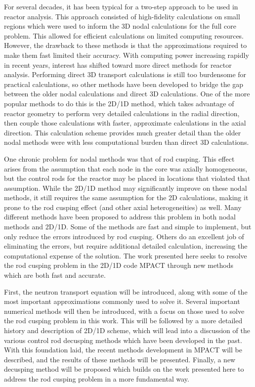 For several decades, it has been typical for a two-step approach to be used in reactor analysis.  This approach consisted of high-fidelity calculations on small regions which were used to inform the 3D nodal calculations for the full core problem.  This allowed for efficient calculations on limited computing resources.  However, the drawback to these methods is that the approximations required to make them fast limited their accuracy.  With computing power increasing rapidly in recent years, interest has shifted toward more direct methods for reactor analysis.  Performing direct 3D transport calculations is still too burdensome for practical calculations, so other methods have been developed to bridge the gap between the older nodal calculations and direct 3D calculations.  One of the more popular methods to do this is the 2D/1D method, which takes advantage of reactor geometry to perform very detailed calculations in the radial direction, then couple those calculations with faster, approximate calculations in the axial direction.  This calculation scheme provides much greater detail than the older nodal methods were with less computational burden than direct 3D calculations.

One chronic problem for nodal methods was that of rod cusping.  This effect arises from the assumption that each node in the core was axially homogeneous, but the control rods for the reactor may be placed in locations that violated that assumption.  While the 2D/1D method may significantly improve on these nodal methods, it still requires the same assumption for the 2D calculations, making it prone to the rod cusping effect (and other axial heterogeneities) as well.  Many different methods have been proposed to address this problem in both nodal methods and 2D/1D.  Some of the methods are fast and simple to implement, but only reduce the errors introduced by rod cusping.  Others do an excellent job of eliminating the errors, but require additional detailed calculation, increasing the computational expense of the solution.  The work presented here seeks to resolve the rod cusping problem in the 2D/1D code MPACT through new methods which are both fast and accurate.

First, the neutron transport equation will be introduced, along with some of the most important approximations commonly used to solve it.  Several important numerical methods will then be introduced, with a focus on those used to solve the rod cusping problem in this work.  This will be followed by a more detailed history and description of 2D/1D scheme, which will lead into a discussion of the various control rod decusping methods which have been developed in the past.  With this foundation laid, the recent methods development in MPACT will be described, and the results of these methods will be presented.  Finally, a new decusping method will be proposed which builds on the work presented here to address the rod cusping problem in a more fundamental way.